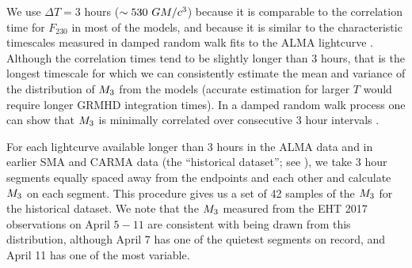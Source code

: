 We use $\Delta T = 3$ hours ($\sim 530~GM/c^3$) because it is comparable to the correlation time for $F_{230}$ in most of the models, and because it is similar to the characteristic timescales measured in damped random walk fits to the ALMA lightcurve \citep[see Table 10 of][]{Wielgus2022}.  Although the correlation times tend to be slightly longer than 3 hours, that is the longest timescale for which we can consistently estimate the mean and variance of the distribution of $M_{3}$ from the models (accurate estimation for larger $T$ would require longer GRMHD integration times).  In a damped random walk process one can show that $M_{3}$ is minimally correlated over consecutive 3 hour intervals \citep{Lee_2022}.

For each lightcurve available longer than 3 hours in the ALMA data and in earlier SMA and CARMA data (the ``historical dataset''; see \citealt{Wielgus2022}), we take 3 hour segments equally spaced away from the endpoints and each other and calculate  $M_{3}$ on each segment. This procedure gives us a set of 42 samples of the $M_{3}$ for the historical dataset. We note that the $M_{3}$ measured from the EHT 2017 observations on April $5-11$ are consistent with being drawn from this distribution, although April 7 has one of the quietest segments on record, and April 11 has one of the most variable.



